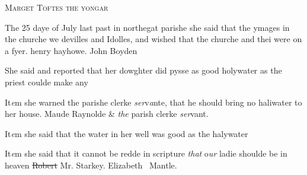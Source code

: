\documentclass[12pt, a4paper]{book}
\begin{document}
				\begin{center}  {\scshape Marget Toftes the yongar}  \end{center}
			

	
				\marginpar[\vspace{0.5cm}{\textcolor{Gray}{1}}]{}
			
	
				\marginpar[\vspace{0.5cm}{\textcolor{Gray}{Images}}]{}
			
	
		\ifthenelse{\isodd{\thepage}}
		{\reversemarginpar}
		{\normalmarginpar}
		The 25 daye of July last past in northegat
 parishe she said that the ymages in the churche
  we devilles and Idolles, and wished that the churche
  and thei were on a fyer. henry hayhowe. John Boyden

 
               	
               		
			
               		
				\marginpar[\vspace{0.5cm}{\textcolor{Gray}{2}}]{}
			
	               	
		\ifthenelse{\isodd{\thepage}}
		{\reversemarginpar}
		{\normalmarginpar}
		She said and reported that her dowghter did
 pysse as good holywater as the priest coulde
 make any
               	
 
 	
				\marginpar[\vspace{0.5cm}{\textcolor{Gray}{3}}]{}
			
               	
		\ifthenelse{\isodd{\thepage}}
		{\reversemarginpar}
		{\normalmarginpar}
		It\textit{e}m she warned the parishe clerke \textit{ser}v\textit{a}nte, that he
 should bring no haliwater to her house.
               		Maude Raynolde \& \textit{the} parish clerke \textit{ser}vant.
 
               	
			
				\marginpar[\vspace{0.5cm}{\textcolor{Gray}{4}}]{}
			
               		
		\ifthenelse{\isodd{\thepage}}
		{\reversemarginpar}
		{\normalmarginpar}
		It\textit{e}m she said that the water in her well was good
 	as the halywater
               		
		\ifthenelse{\isodd{\thepage}}
		{\reversemarginpar}
		{\normalmarginpar}
		It\textit{e}m she said that it cannot be redde in scripture \textit{that} o\textit{ur}
               			ladie shoulde be in heaven \sout{Robert} Mr. Starkey. Elizabeth 
 Mantle.
               	
\end{document}

